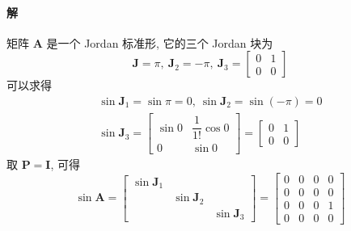 \paragraph*{解} 矩阵 $\bm{A}$ 是一个 Jordan 标准形, 它的三个 Jordan 块为
$$
    \bm{J} = \pi, \ \bm{J}_2 = -\pi, \ \bm{J}_3 = \begin{bmatrix}
        0 & 1 \\
        0 & 0
    \end{bmatrix}
$$
可以求得
\begin{gather*}
    \sin \bm{J}_1 = \sin \pi = 0, \ \sin \bm{J}_2 = \sin(-\pi) = 0 \\
    \sin \bm{J}_3 = \begin{bmatrix}
        \sin0 & \dfrac{1}{1!}\cos0 \\
        0 & \sin0
    \end{bmatrix} = \begin{bmatrix}
        0 & 1 \\
        0 & 0
    \end{bmatrix}
\end{gather*}
取 $\bm{P} = \bm{I}$, 可得
$$
    \sin\bm{A} = \begin{bmatrix}
        \sin\bm{J}_1 &              &              \\
                     & \sin\bm{J}_2 &              \\
                     &              & \sin\bm{J}_3
    \end{bmatrix} = \begin{bmatrix}
        0 & 0 & 0 & 0 \\
        0 & 0 & 0 & 0 \\
        0 & 0 & 0 & 1 \\
        0 & 0 & 0 & 0
    \end{bmatrix}
$$